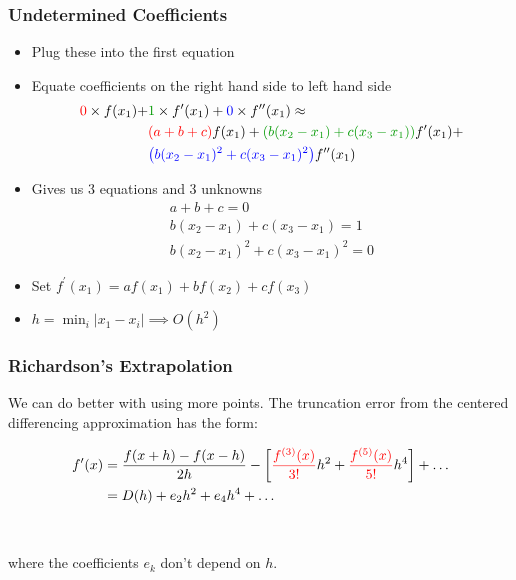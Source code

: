 \documentclass{beamer}
\begin{document}
\begin{frame}
	\frametitle{Undetermined Coefficients}
	\begin{itemize}
		\setlength\itemsep{1em}
			\item Plug these into the first equation
			\item Equate coefficients on the right hand side to left hand side
			\begin{align*}
				{\color{red}0}\times f(x_1) + & {\color{mygreen}1}\times f^\prime(x_1) +  {\color{blue}0}\times f^{\prime\prime}(x_1) \approx \\ &{\color{red}(a+b+c)} f(x_1) +
				 {\color{mygreen}\left(b(x_2-x_1) + c(x_3-x_1)\right)} f^\prime(x_1) + \\& 	{\color{blue}\left(b(x_2-x_1)^2 + c(x_3-x_1)^2\right)} f^{\prime\prime}(x_1)
			\end{align*}
			\item Gives us 3 equations and 3 unknowns
				\begin{align*}
					a+b+c=0\\
					b(x_2-x_1) + c(x_3-x_1) = 1\\
					b(x_2-x_1)^2 + c(x_3-x_1)^2 = 0 
				\end{align*}
			\item Set $f^\prime(x_1) = af(x_1) + bf(x_2)  + c f(x_3)$
			\item $h = \min_i {|x_1-x_i|} \implies O(h^2)$
	\end{itemize}	
\end{frame}




\begin{frame}
\frametitle{Richardson’s Extrapolation}

We can do better with using more points.  The truncation error from the centered differencing approximation has the form:

\begin{align*}
f'(x) &= \frac{f(x+h) - f(x-h)}{2h} - \left[ {\color{red}\frac{f^{(3)}(x)}{3!} }h^2 + {\color{red}\frac{f^{(5)}(x)}{5!} } h^4 \right] + \ldots \\
&= D(h) + e_2h^2 + e_4 h^4 + \ldots
\end{align*}
\hfill\\ \hfill\\
where the coefficients $e_k$ don't depend on $h$.  

\end{frame}
\end{document}
